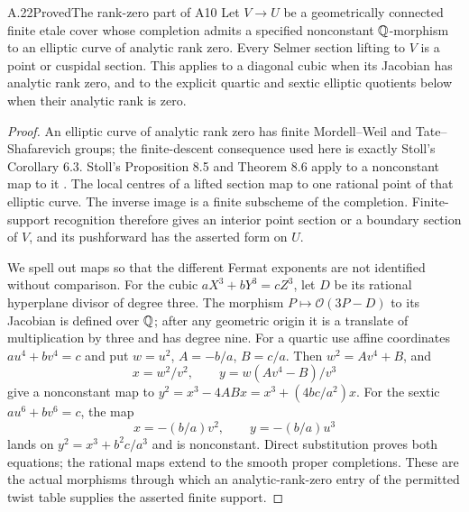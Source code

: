 \begin{statement}{A.22}{Proved}{The rank-zero part of A10}
Let $V\to U$ be a geometrically connected finite etale cover whose
completion admits a specified nonconstant $\mathbb Q$-morphism to an elliptic
curve of analytic rank zero.  Every Selmer section lifting to $V$ is
a point or cuspidal section.  This applies to a diagonal cubic when
its Jacobian has analytic rank zero, and to the explicit quartic and
sextic elliptic quotients below when their analytic rank is zero.
\end{statement}
\begin{proof}
An elliptic curve of analytic rank zero has finite Mordell--Weil and
Tate--Shafarevich groups; the finite-descent consequence used here is
exactly Stoll's Corollary 6.3.  Stoll's Proposition 8.5 and Theorem 8.6
apply to a nonconstant map to it \cite{LegStoll2007,LegStollErrata2017}.
The local centres of a lifted section map to one rational point of
that elliptic curve.  The inverse image is a finite subscheme of the
completion.  Finite-support recognition therefore gives an interior
point section or a boundary section of $V$, and its pushforward has
the asserted form on $U$.

We spell out maps so that the different Fermat exponents are not
identified without comparison.  For the cubic
$aX^3+bY^3=cZ^3$, let $D$ be its rational hyperplane divisor of
degree three.  The morphism
$P\mapsto\mathcal O(3P-D)$ to its Jacobian is defined over $\mathbb Q$;
after any geometric origin it is a translate of multiplication by
three and has degree nine.  For a quartic use affine coordinates
$au^4+bv^4=c$ and put $w=u^2$, $A=-b/a$, $B=c/a$.
Then $w^2=Av^4+B$, and
\[
       x=w^2/v^2,\qquad y=w(Av^4-B)/v^3
\]
give a nonconstant map to
$y^2=x^3-4ABx=x^3+(4bc/a^2)x$.
For the sextic $au^6+bv^6=c$, the map
\[
                  x=-(b/a)v^2,\qquad y=-(b/a)u^3
\]
lands on $y^2=x^3+b^2c/a^3$ and is nonconstant.
Direct substitution proves both equations; the rational maps extend
to the smooth proper completions.  These are the actual morphisms
through which an analytic-rank-zero entry of the permitted twist
table supplies the asserted finite support.
\end{proof}

